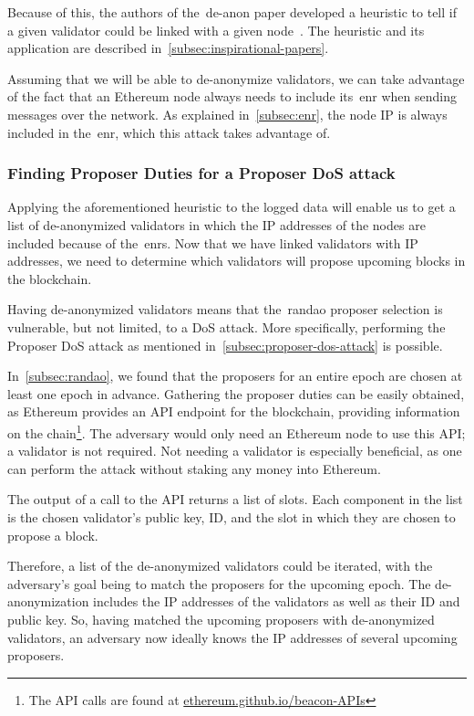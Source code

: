 Because of this, the authors of the~\gls{de-anon paper} developed a heuristic to tell if a given validator could be linked with a given node~\cite{heimbach2024deanonymizingethereumvalidatorsp2p}.
The heuristic and its application are described in~\autoref{subsec:inspirational-papers}.

Assuming that we will be able to de-anonymize validators, we can take advantage of the fact that an Ethereum node always needs to include its~\gls{enr} when sending messages over the network.
As explained in~\autoref{subsec:enr}, the node IP is always included in the~\gls{enr}, which this attack takes advantage of.

\subsubsection{Finding Proposer Duties for a Proposer DoS attack}
Applying the aforementioned heuristic to the logged data will enable us to get a list of de-anonymized validators in which the IP addresses of the nodes are included because of the~\glspl{enr}.
Now that we have linked validators with IP addresses, we need to determine which validators will propose upcoming blocks in the blockchain.

Having de-anonymized validators means that the~\gls{randao} proposer selection is vulnerable, but not limited, to a DoS attack.
More specifically, performing the Proposer DoS attack as mentioned in~\autoref{subsec:proposer-dos-attack} is possible.

In~\autoref{subsec:randao}, we found that the proposers for an entire epoch are chosen at least one epoch in advance.
Gathering the proposer duties can be easily obtained, as Ethereum provides an API endpoint for the blockchain, providing information on the chain\footnote{The API calls are found at \href{https://ethereum.github.io/beacon-APIs/\#/Validator/getProposerDuties}{ethereum.github.io/beacon-APIs}}.
The adversary would only need an Ethereum node to use this API; a validator is not required.
Not needing a validator is especially beneficial, as one can perform the attack without staking any money into Ethereum.

The output of a call to the API returns a list of slots.
Each component in the list is the chosen validator's public key, ID, and the slot in which they are chosen to propose a block.

Therefore, a list of the de-anonymized validators could be iterated, with the adversary's goal being to match the proposers for the upcoming epoch.
The de-anonymization includes the IP addresses of the validators as well as their ID and public key.
So, having matched the upcoming proposers with de-anonymized validators, an adversary now ideally knows the IP addresses of several upcoming proposers.

